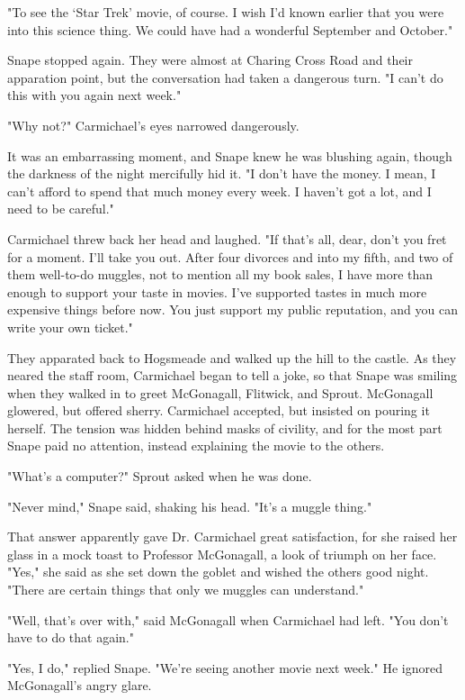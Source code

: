 "To see the `Star Trek' movie, of course. I wish I'd known earlier that you were into this science thing. We could have had a wonderful September and October."

Snape stopped again. They were almost at Charing Cross Road and their apparation point, but the conversation had taken a dangerous turn. "I can't do this with you again next week."

"Why not?" Carmichael's eyes narrowed dangerously.

It was an embarrassing moment, and Snape knew he was blushing again, though the darkness of the night mercifully hid it. "I don't have the money. I mean, I can't afford to spend that much money every week. I haven't got a lot, and I need to be careful."

Carmichael threw back her head and laughed. "If that's all, dear, don't you fret for a moment. I'll take you out. After four divorces and into my fifth, and two of them well-to-do muggles, not to mention all my book sales, I have more than enough to support your taste in movies. I've supported tastes in much more expensive things before now. You just support my public reputation, and you can write your own ticket."

They apparated back to Hogsmeade and walked up the hill to the castle. As they neared the staff room, Carmichael began to tell a joke, so that Snape was smiling when they walked in to greet McGonagall, Flitwick, and Sprout. McGonagall glowered, but offered sherry. Carmichael accepted, but insisted on pouring it herself. The tension was hidden behind masks of civility, and for the most part Snape paid no attention, instead explaining the movie to the others.

"What's a computer?" Sprout asked when he was done.

"Never mind," Snape said, shaking his head. "It's a muggle thing."

That answer apparently gave Dr. Carmichael great satisfaction, for she raised her glass in a mock toast to Professor McGonagall, a look of triumph on her face. "Yes," she said as she set down the goblet and wished the others good night. "There are certain things that only we muggles can understand."

"Well, that's over with," said McGonagall when Carmichael had left. "You don't have to do that again."

"Yes, I do," replied Snape. "We're seeing another movie next week." He ignored McGonagall's angry glare.

